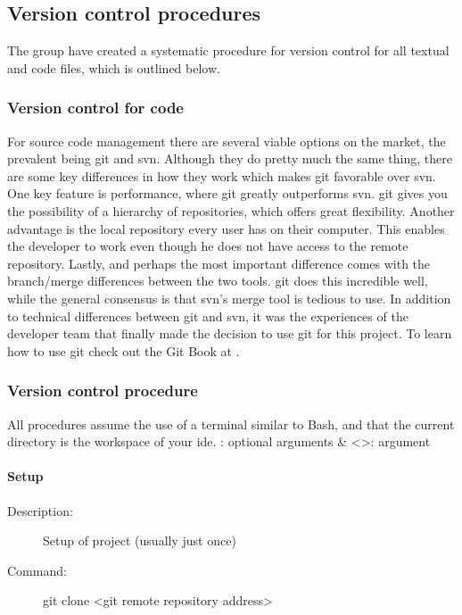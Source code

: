 

\subsection{Version control procedures}
The group have created a systematic procedure for version control for all textual and code files, which is outlined below.

\subsubsection{Version control for code}
For source code management there are several viable options on the market, the prevalent being \gls{git} and \gls{svn}. Although they do pretty much the same thing, there are some key differences in how they work which makes \gls{git} favorable over \gls{svn}. One key feature is performance, where \gls{git} greatly outperforms \gls{svn}. \gls{git} gives you the possibility of a hierarchy of repositories, which offers great flexibility. Another advantage is the local repository every user has on their computer. This enables the developer to work even though he does not have access to the remote repository. Lastly, and perhaps the most important difference comes with the branch/merge differences between the two tools. \gls{git} does this incredible well, while the general consensus is that \gls{svn}’s merge tool is tedious to use.  
\newline
\newline
In addition to technical differences between \gls{git} and \gls{svn}, it was the experiences of the developer team that finally made the decision to use \gls{git} for this project. To learn how to use \gls{git} check out the Git Book at \cite{bib:gitbook}.

\newpage

\subsubsection{Version control procedure}
All procedures assume the use of a terminal similar to Bash, and that the current directory is the workspace of your \gls{ide}.
\newline
\newline
[]: optional arguments \& <>: argument

\paragraph{Setup}
\begin{description}
\item[Description:] Setup of project (usually just once)
\item[Command:] git clone <git remote repository address>
\end{description}

